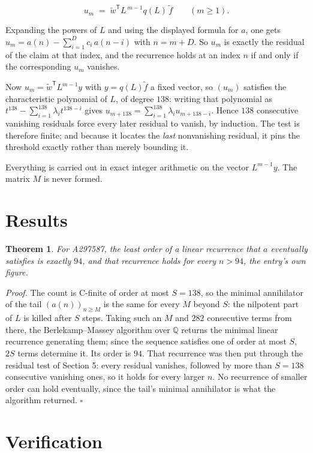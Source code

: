 \documentclass[11pt]{article}
\newtheorem{theorem}{Theorem}
\theoremstyle{definition}
\begin{document}
\[u_m \;=\; \tilde w^{\mathsf T} L^{\,m-1} q(L)\,\tilde f \qquad (m \ge 1).\]

Expanding the powers of $L$ and using the displayed formula for $a$, one gets $u_m = a(n) - \sum_{i=1}^{D} c_i\,a(n-i)$ with $n = m + D$. So $u_m$ is exactly the residual of the claim at that index, and the recurrence holds at an index $n$ if and only if the corresponding $u_m$ vanishes.

Now $u_m = \tilde w^{\mathsf T} L^{m-1} y$ with $y = q(L)\tilde f$ a fixed vector, so $(u_m)$ satisfies the characteristic polynomial of $L$, of degree $138$: writing that polynomial as $t^{138} - \sum_{i=1}^{138} \lambda_i t^{138-i}$ gives $u_{m+138} = \sum_{i=1}^{138} \lambda_i u_{m+138-i}$. Hence $138$ consecutive vanishing residuals force every later residual to vanish, by induction. The test is therefore finite; and because it locates the {\itshape last} nonvanishing residual, it pins the threshold exactly rather than merely bounding it.

Everything is carried out in exact integer arithmetic on the vector $L^{m-1}y$. The matrix $M$ is never formed.

\section{Results}

\begin{theorem} For A297587, the least order of a linear recurrence that $a$ eventually satisfies is exactly $94$, and that recurrence holds for every $n > 94$, the entry's own figure.\end{theorem}

{\itshape Proof.} The count is C-finite of order at most $S = 138$, so the minimal annihilator of the tail $(a(n))_{n \ge M}$ is the same for every $M$ beyond $S$: the nilpotent part of $L$ is killed after $S$ steps. Taking such an $M$ and $282$ consecutive terms from there, the Berlekamp--Massey algorithm over $\mathbb{Q}$ returns the minimal linear recurrence generating them; since the sequence satisfies one of order at most $S$, $2S$ terms determine it. Its order is $94$. That recurrence was then put through the residual test of Section 5: every residual vanishes, followed by more than $S = 138$ consecutive vanishing ones, so it holds for every larger $n$. No recurrence of smaller order can hold eventually, since the tail's minimal annihilator is what the algorithm returned. $\square$

\section{Verification}
\end{document}
